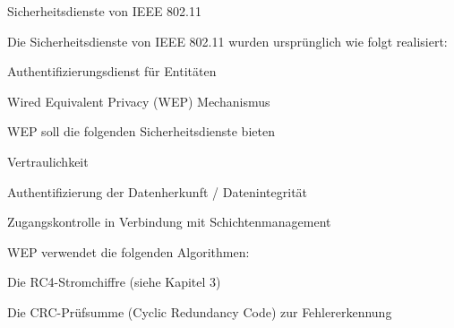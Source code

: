 \documentclass[a4paper]{article}
\begin{document}
\begin{multicols}{3}
      Sicherheitsdienste von IEEE 802.11
      \begin{itemize*}
            \item Die Sicherheitsdienste von IEEE 802.11 wurden ursprünglich wie folgt realisiert:
            \begin{itemize*}
                  \item Authentifizierungsdienst für Entitäten
                  \item Wired Equivalent Privacy (WEP) Mechanismus
            \end{itemize*}
            \item WEP soll die folgenden Sicherheitsdienste bieten
            \begin{itemize*}
                  \item Vertraulichkeit
                  \item Authentifizierung der Datenherkunft / Datenintegrität
                  \item Zugangskontrolle in Verbindung mit Schichtenmanagement
            \end{itemize*}
            \item WEP verwendet die folgenden Algorithmen:
            \begin{itemize*}
                  \item Die RC4-Stromchiffre (siehe Kapitel 3)
                  \item Die CRC-Prüfsumme (Cyclic Redundancy Code) zur Fehlererkennung
            \end{itemize*}
      \end{itemize*}


\end{multicols}
\end{document}
